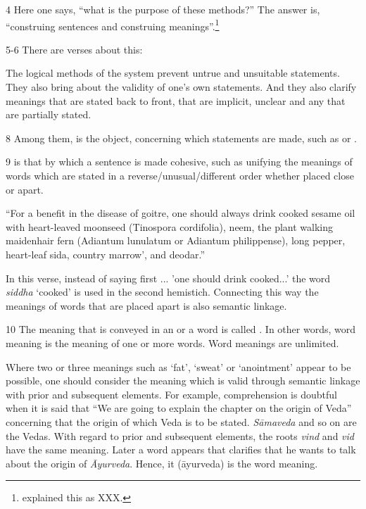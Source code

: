 \begin{translation}
\item [4] Here one says, “what is the purpose of these methods?” The
answer is, “construing sentences and construing
meanings”.\footnote{ explained this as XXX.}

\item [5-6] There are  verses about this:
  
\begin{sloka}
The logical methods of the system prevent untrue and unsuitable
statements. They also bring about the validity of one’s own
statements.  And they also clarify meanings that are stated back to
front, that are implicit, unclear and any that are partially stated.
\end{sloka}

\item [8] Among them,  is the object, concerning which 
statements are made, such as  or . 

\item [9]  is that by which a sentence is made 
cohesive, such as unifying the meanings of words which are stated in a 
reverse/unusual/different order whether placed close or apart.

``For a benefit in the disease of goitre, one should always drink cooked sesame 
oil with heart-leaved moonseed (Tinospora cordifolia), neem, the plant walking 
maidenhair fern (Adiantum lunulatum or Adiantum philippense), long pepper, 
heart-leaf sida, country marrow', and deodar.'' 

In this verse, instead of saying first ... 'one should drink 
cooked...' the word \emph{siddha} `cooked' is used in the second hemistich. 
Connecting this way the meanings of words that are placed apart is also 
semantic linkage.  
 

\item [10] The meaning that is conveyed in an  or a word is 
called . In other words, word meaning is the 
meaning of one or more words. Word meanings are unlimited. 

   Where two or three meanings such as `fat’, `sweat’ or `anointment’ appear to be possible, one should consider the meaning which is valid through semantic linkage with prior and subsequent elements. For example, comprehension is doubtful when it is said that “We are going to explain the chapter on the origin of Veda” concerning that the origin of which Veda is to be stated. \emph{Sāmaveda} and so on are the Vedas. With regard to prior and subsequent elements, the roots \emph{vind} and \emph{vid} have the same meaning. Later a word appears that clarifies that he wants to talk about the origin of \emph{Āyurveda}. Hence, it (āyurveda) is the word meaning.  


\end{translation}
